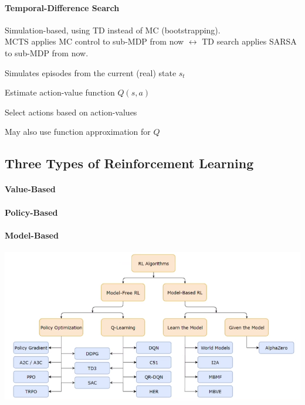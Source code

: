 \documentclass[10pt]{report}
\begin{document}
\paragraph{Temporal-Difference Search} Simulation-based, using TD instead of MC (bootstrapping).\\
MCTS applies MC control to sub-MDP from now $\leftrightarrow$ TD search applies SARSA to sub-MDP from now.
\begin{list}{}{}
	\item Simulates episodes from the current (real) state $s_t$
	\item Estimate action-value function $Q(s,a)$
	\item %
	\item Select actions based on action-values %
	\item May also use function approximation for $Q$
\end{list}
\subsection{Three Types of Reinforcement Learning} \begin{multicols}{3}
\paragraph{Value-Based} \begin{list}{}{}
	\item %
\end{list}
\paragraph{Policy-Based} \begin{list}{}{}
	\item %
\end{list}
\paragraph{Model-Based} \begin{list}{}{}
	\item %
\end{list}
\end{multicols}
\begin{center}
	\includegraphics[scale=0.5]{190.png}
\end{center}
\end{document}
